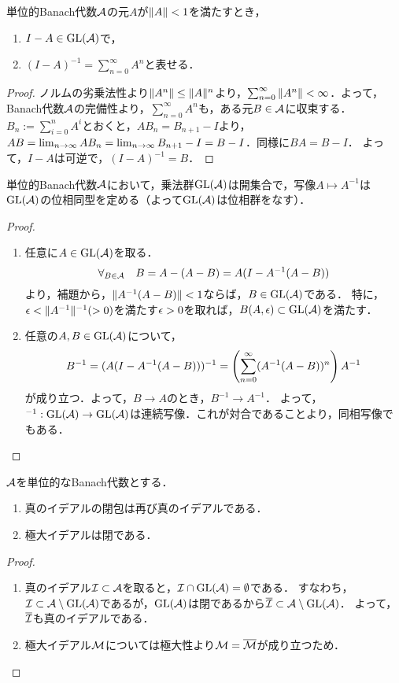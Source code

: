 \documentclass[uplatex,dvipdfmx]{jsreport}
\begin{document}
\begin{lemma}\label{lemma-Neumann-series}
    単位的Banach代数$\mathcal{A}$の元$A$が$\|A\|<1$を満たすとき，
    \begin{enumerate}
        \item $I-A\in\mathrm{GL}(\mathcal{A})$で，
        \item $(I-A)^{-1}=\sum^\infty_{n=0}A^n$と表せる．
    \end{enumerate}
\end{lemma}
\begin{proof}
    ノルムの劣乗法性より$\|A^n\|\le\|A\|^n$より，$\sum_{n=0}^\infty\|A^n\|<\infty$．よって，Banach代数$\mathcal{A}$の完備性より，$\sum_{n=0}^{\infty}A^n$も，ある元$B\in\mathcal{A}$に収束する．
    $B_n:=\sum_{i=0}^nA^i$とおくと，$AB_n=B_{n+1}-I$より，$AB=\lim_{n\to\infty}AB_n=\lim_{n\to\infty} B_{n+1}-I=B-I$．同様に$BA=B-I$．
    よって，$I-A$は可逆で，$(I-A)^{-1}=B$．
\end{proof}

\begin{proposition}
    単位的Banach代数$\mathcal{A}$において，乗法群$\mathrm{GL}(\mathcal{A})$は開集合で，写像$A\mapsto A^{-1}$は$\mathrm{GL}(\mathcal{A})$の位相同型を定める（よって$\mathrm{GL}(\mathcal{A})$は位相群をなす）．
\end{proposition}
\begin{proof}\mbox{}
    \begin{enumerate}
        \item 任意に$A\in\mathrm{GL}(\mathcal{A})$を取る．
        \[\forall_{B\in\mathcal{A}}\quad B=A-(A-B)=A(I-A^{-1}(A-B))\]
        より，補題から，$\|A^{-1}(A-B)\|<1$ならば，$B\in\mathrm{GL}(\mathcal{A})$である．
        特に，$\epsilon<\|A^{-1}\|^{-1}(>0)$を満たす$\epsilon>0$を取れば，$B(A,\epsilon)\subset\mathrm{GL}(\mathcal{A})$を満たす．
        \item 任意の$A,B\in\mathrm{GL}(\mathcal{A})$について，
        \[B^{-1}=(A(I-A^{-1}(A-B)))^{-1}=\left(\sum^\infty_{n=0}(A^{-1}(A-B))^n\right)A^{-1}\]
        が成り立つ．よって，$B\to A$のとき，$B^{-1}\to A^{-1}$．
        よって，${}^{-1}:\mathrm{GL}(\mathcal{A})\to\mathrm{GL}(\mathcal{A})$は連続写像．これが対合であることより，同相写像でもある．
    \end{enumerate}
\end{proof}

\begin{corollary}\label{cor-maximal-ideal-is-closed}
    $\mathcal{A}$を単位的なBanach代数とする．
    \begin{enumerate}
        \item 真のイデアルの閉包は再び真のイデアルである．
        \item 極大イデアルは閉である．
    \end{enumerate}
\end{corollary}
\begin{proof}\mbox{}
    \begin{enumerate}
        \item 真のイデアル$\mathcal{I}\subset\mathcal{A}$を取ると，$\mathcal{I}\cap\mathrm{GL}(\mathcal{A})=\emptyset$である．
        すなわち，$\mathcal{I}\subset\mathcal{A}\setminus\mathrm{GL}(\mathcal{A})$であるが，$\mathrm{GL}(\mathcal{A})$は閉であるから$\overline{\mathcal{I}}\subset\mathcal{A}\setminus\mathrm{GL}(\mathcal{A})$．
        よって，$\overline{\mathcal{I}}$も真のイデアルである．
        \item 極大イデアル$\mathcal{M}$については極大性より$\mathcal{M}=\overline{\mathcal{M}}$が成り立つため．
    \end{enumerate}
\end{proof}
\end{document}
